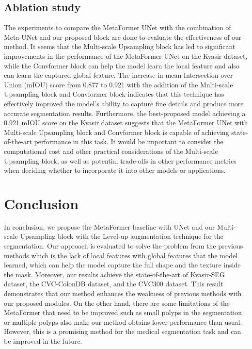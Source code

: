 \documentclass[conference]{IEEEtran}
\begin{document}
\subsection{Ablation study}
The experiments to compare the MetaFormer UNet with the combination of Meta-UNet and our proposed block are done to evaluate the effectiveness of our method. It seems that the Multi-scale Upsampling block has led to significant improvements in the performance of the MetaFormer UNet on the Kvasir dataset, while the Convformer block can help the model learn the local feature and also can learn the captured global feature. The increase in mean Intersection over Union (mIOU) score from 0.877 to 0.921 with the addition of the Multi-scale Upsampling block and Convformer block indicates that this technique has effectively improved the model's ability to capture fine details and produce more accurate segmentation results.  Furthermore, the best-proposed model achieving a 0.921 mIOU score on the Kvasir dataset suggests that the MetaFormer UNet with Multi-scale Upsampling block and Convformer block is capable of achieving state-of-the-art performance in this task. It would be important to consider the computational cost and other practical considerations of the Multi-scale Upsampling block, as well as potential trade-offs in other performance metrics when deciding whether to incorporate it into other models or applications.

\section{Conclusion}

In conclusion, we propose the MetaFormer baseline with UNet and our Multi-scale Upsampling block with the Level-up augmentation technique for the segmentation. Our approach is evaluated to solve the problem from the previous methods which is the lack of local features with global features that the model learned, which can help the model capture the full shape and the texture inside the mask. Moreover, our results achieve the state-of-the-art of Kvasir-SEG dataset, the CVC-ColonDB dataset, and the CVC300 dataset. This result demonstrates that our method enhances the weakness of previous methods with our proposed modules. On the other hand, there are some limitations of the MetaFormer that need to be improved such as small polyps in the segmentation or multiple polyps also make our method obtains lower performance than usual. However, this is a promising method for the medical segmentation task and can be improved in the future.




\end{document}
